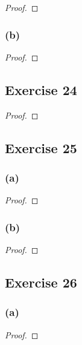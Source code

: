 \documentclass[14pt]{extarticle}
\begin{document}
\begin{proof}

\end{proof}

\subsubsection{(b)}

\begin{proof}

\end{proof}

\subsection{Exercise 24}

\begin{proof}

\end{proof}

\subsection{Exercise 25}

\subsubsection{(a)}

\begin{proof}

\end{proof}

\subsubsection{(b)}

\begin{proof}

\end{proof}

\subsection{Exercise 26}

\subsubsection{(a)}

\begin{proof}

\end{proof}
\end{document}
